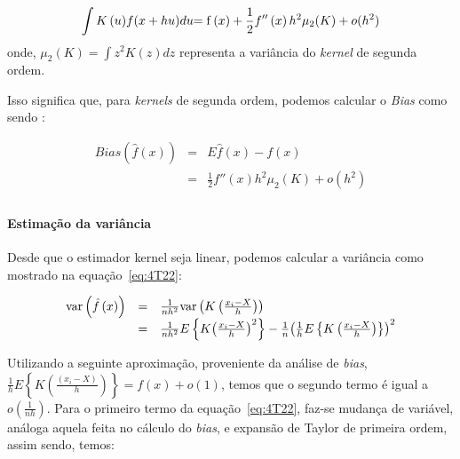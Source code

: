 \begin{equation}\label{eq:4T20}
\int {K\left( u \right)} f(x + hu)du{\rm{ = f}}\left( x \right) + \frac{1}{2}f''\left( x \right){h^2}{\mu _2}(K) + o({h^2})
\end{equation}
onde, ${\mu _2}\left( K \right) = \int {{z^2}K\left( z \right)dz}$ representa a variância do \emph{kernel} de segunda ordem.

Isso significa que, para \emph{kernels} de segunda ordem, podemos calcular o \emph{Bias} como sendo \cite{hansen2009lecture}:

\begin{equation}\label{eq:4T21}
\begin{array}{ccl}
 Bias\left( {\hat f\left( x \right)} \right) &=& E\hat f\left( x \right) - f\left( x \right) \\
 &=&\frac{1}{2}{f''}\left( x \right){h^2}{\mu _2}(K) + o({h^2}) \\
 \end{array}
\end{equation}

\paragraph{Estimação da variância}

Desde que o estimador kernel seja linear, podemos calcular a variância como mostrado na equação~\ref{eq:4T22}:

\begin{equation}\label{eq:4T22}
\begin{array}{ccl}
 {\mathop{\rm var}} \left( {\hat f\left( x \right)} \right) &=& \frac{1}{{n{h^2}}}{\mathop{\rm var}} \left( {K\left( {\frac{{{x_i} - X}}{h}} \right)} \right) \\
  &=& \frac{1}{{n{h^2}}}E\left\{ {K{{\left( {\frac{{{x_i} - X}}{h}} \right)}^2}} \right\} - \frac{1}{n}{\left( {\frac{1}{h}E\left\{ {K\left( {\frac{{{x_i} - X}}{h}} \right)} \right\}} \right)^2} \\
 \end{array}
\end{equation}

Utilizando a seguinte aproximação, proveniente da análise de \emph{bias}, $\frac{1}{h}E\left\{ {K\left( {\frac{{({x_i} - X)}}{h}} \right)} \right\} = f\left( x \right) + o\left( 1 \right)$, temos que o segundo termo é igual a $o\left( {\frac{1}{{nh}}} \right)$. Para o primeiro termo da equação~\ref{eq:4T22}, faz-se mudança de variável, análoga aquela feita no cálculo do \emph{bias}, e expansão de Taylor de primeira ordem, assim sendo, temos:

